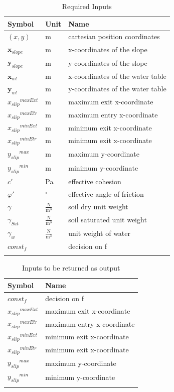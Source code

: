 \documentclass[12pt]{article}
\begin{document}
\begin{longtable}{l l l}
\toprule
Symbol & Unit & Name
\\
\midrule
\endhead
$(x,y)$ & m & cartesian position coordinates
\\
${\mathbf{x}_{slope}}$ & m & x-coordinates of the slope
\\
${\mathbf{y}_{slope}}$ & m & y-coordinates of the slope
\\
${\mathbf{x}_{wt}}$ & m & x-coordinates of the water table
\\
${\mathbf{y}_{wt}}$ & m & y-coordinates of the water table
\\
${{x_{slip}}^{maxExt}}$ & m & maximum exit x-coordinate
\\
${{x_{slip}}^{maxEtr}}$ & m & maximum entry x-coordinate
\\
${{x_{slip}}^{minExt}}$ & m & minimum exit x-coordinate
\\
${{x_{slip}}^{minEtr}}$ & m & minimum exit x-coordinate
\\
${{y_{slip}}^{max}}$ & m & maximum y-coordinate
\\
${{y_{slip}}^{min}}$ & m & minimum y-coordinate
\\
$c'$ & Pa & effective cohesion
\\
$φ'$ & ${}^{\circ}$ & effective angle of friction
\\
$γ$ & $\frac{\text{N}}{\text{m}^{3}}$ & soil dry unit weight
\\
${γ_{Sat}}$ & $\frac{\text{N}}{\text{m}^{3}}$ & soil saturated unit weight
\\
${γ_{w}}$ & $\frac{\text{N}}{\text{m}^{3}}$ & unit weight of water
\\
$const_f$ &  & decision on f
\\
\bottomrule
\caption{Required Inputs}
\label{Table:inDataTable}
\end{longtable}
\begin{longtable}{l l}
\toprule
Symbol & Name
\\
\midrule
\endhead
$const_f$ & decision on f
\\
${{x_{slip}}^{maxExt}}$ & maximum exit x-coordinate
\\
${{x_{slip}}^{maxEtr}}$ & maximum entry x-coordinate
\\
${{x_{slip}}^{minExt}}$ & minimum exit x-coordinate
\\
${{x_{slip}}^{minEtr}}$ & minimum exit x-coordinate
\\
${{y_{slip}}^{max}}$ & maximum y-coordinate
\\
${{y_{slip}}^{min}}$ & minimum y-coordinate
\\
\bottomrule
\caption{Inputs to be returned as output}
\label{Table:inputsToOutputTable}
\end{longtable}
\end{document}

